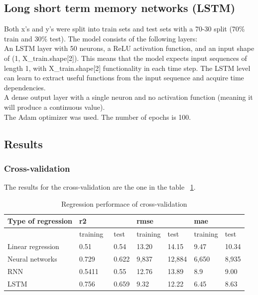 \subsection{Long short term memory networks (LSTM)}
Both x's and y's were split into train sets and test sets with a 70-30 split (70\% train and 30\% test).
The model consists of the following layers:
\\An LSTM layer with 50 neurons, a ReLU activation function, and an input shape of (1, X\_train.shape[2]). This means that the model expects input sequences of length 1, with X\_train.shape[2] functionality in each time step. The LSTM level can learn to extract useful functions from the input sequence and acquire time dependencies.
\\A dense output layer with a single neuron and no activation function (meaning it will produce a continuous value).
\\The Adam optimizer was used. The number of epochs is 100.

\subsection{Results}
\subsubsection{Cross-validation}
The results for the cross-validation are the one in the table ~\ref{tab:tableeee5}.

\begin{table}[!ht]
    \centering
    \begin{tabular}{|l|l|l|l|l|l|l|}
    \hline
        Type of regression & r2 & ~ & rmse & ~ & mae & ~ \\ \hline
        ~ & training  & test & training & test & training & test \\ \hline
        Linear regression & 0.51 & 0.54 & 13.20 & 14.15 & 9.47 & 10.34 \\ \hline
        Neural networks & 0.729 & 0.622 & 9,837 & 12,884 & 6,650 & 8,935 \\ \hline
        RNN & 0.5411 & 0.55 & 12.76 & 13.89 & 8.9 & 9.00 \\ \hline
        LSTM  & 0.756 & 0.659 & 9.32 & 12.22 & 6.45 & 8.63 \\ \hline
    \end{tabular}
    \label{tab:tableeee5}
    \caption{Regression performace of cross-validation}
\end{table}

